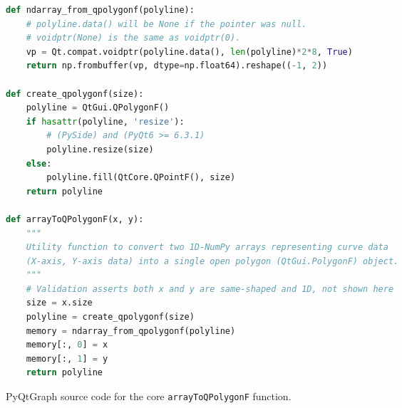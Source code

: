 \renewcommand\textfraction{.05}
\begin{table}[!hbt]
\begin{lstlisting}[language=python]
def ndarray_from_qpolygonf(polyline):
    # polyline.data() will be None if the pointer was null.
    # voidptr(None) is the same as voidptr(0).
    vp = Qt.compat.voidptr(polyline.data(), len(polyline)*2*8, True)
    return np.frombuffer(vp, dtype=np.float64).reshape((-1, 2))

def create_qpolygonf(size):
    polyline = QtGui.QPolygonF()
    if hasattr(polyline, 'resize'):
        # (PySide) and (PyQt6 >= 6.3.1)
        polyline.resize(size)
    else:
        polyline.fill(QtCore.QPointF(), size)
    return polyline

def arrayToQPolygonF(x, y):
    """
    Utility function to convert two 1D-NumPy arrays representing curve data
    (X-axis, Y-axis data) into a single open polygon (QtGui.PolygonF) object.
    """
    # Validation asserts both x and y are same-shaped and 1D, not shown here
    size = x.size
    polyline = create_qpolygonf(size)
    memory = ndarray_from_qpolygonf(polyline)
    memory[:, 0] = x
    memory[:, 1] = y
    return polyline
\end{lstlisting}
\caption{PyQtGraph source code for the core \texttt{arrayToQPolygonF} function.}
\label{table:arrayToQPolygonF}
\end{table}

